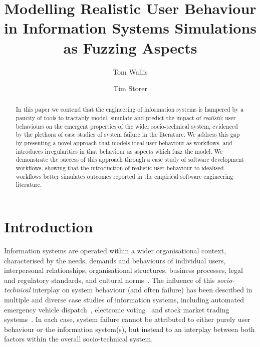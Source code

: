 \documentclass{llncs}
\title{Modelling Realistic User Behaviour in Information Systems Simulations as Fuzzing Aspects}
\author{Tom Wallis \and Tim Storer}  %
\institute{University of Glasgow, Glasgow, Scotland.\\
  \email{w.wallis.1@research.gla.ac.uk}\\
  \email{timothy.storer@glasgow.ac.uk}
}
\begin{document}

\maketitle


\begin{abstract}
  In this paper we contend that the engineering of information systems is hampered by a paucity of tools to tractably
  model, simulate and predict the impact of \emph{realistic} user behaviours on the emergent properties of the wider
  socio-technical system, evidenced by the plethora of case studies of system failure in the literature.  We address
  this gap by presenting a novel approach that models ideal user behaviour as workflows, and introduces irregularities
  in that behaviour as aspects which fuzz the model. We demonstrate the success of this approach through a case study of
  software development workflows, showing that the introduction of realistic user behaviour to idealised workflows
  better simulates outcomes reported in the empirical software engineering literature.
\end{abstract}


\section{Introduction}
\label{sec:introduction}


Information systems are operated within a wider organisational context, characterised by the needs, demands and
behaviours of individual users, interpersonal relationships, organisational structures, business processes, legal and
regulatory standards, and cultural norms~\citep{bade07structures,pentland05organisational}.  The influence of this
\emph{socio-technical} interplay on system behaviour (and often failure) has been described in multiple and diverse case
studies of information systems, including automated emergency vehicle dispatch~\citep{robinson96limited}, electronic
voting~\citep{lock07observations} and stock market trading systems~\citep{cftc-sec10findings}. In each case, system
failure cannot be attributed to either purely user behaviour or the information system(s), but instead to an interplay
between both factors within the overall socio-technical system.
\end{document}
